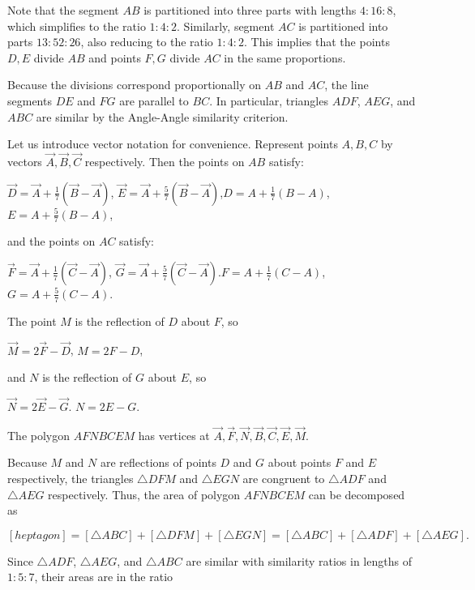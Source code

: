\begin{enumerate}
 Note that the segment \( AB \) is partitioned into three parts with lengths \( 4:16:8 \), which simplifies to the ratio \( 1:4:2 \). Similarly, segment \( AC \) is partitioned into parts \( 13:52:26 \), also reducing to the ratio \( 1:4:2 \). This implies that the points \( D, E \) divide \( AB \) and points \( F, G \) divide \( AC \) in the same proportions.

 Because the divisions correspond proportionally on \( AB \) and \( AC \), the line segments \( DE \) and \( FG \) are parallel to \( BC \). In particular, triangles \( ADF \), \( AEG \), and \( ABC \) are similar by the Angle-Angle similarity criterion.

 Let us introduce vector notation for convenience. Represent points \( A, B, C \) by vectors \( \vec{A}, \vec{B}, \vec{C} \) respectively. Then the points on \( AB \) satisfy:

 \( \vec{D} = \vec{A} + \frac{1}{7} (\vec{B} - \vec{A}) \), \( \vec{E} = \vec{A} + \frac{5}{7} (\vec{B} - \vec{A}) \),\( D = A + \frac{1}{7} (B - A) \), \( E = A + \frac{5}{7} (B - A) \),

 and the points on \( AC \) satisfy:

 \( \vec{F} = \vec{A} + \frac{1}{7} (\vec{C} - \vec{A}) \), \( \vec{G} = \vec{A} + \frac{5}{7} (\vec{C} - \vec{A}) \).\( F = A + \frac{1}{7} (C - A) \), \( G = A + \frac{5}{7} (C - A) \).

 The point \( M \) is the reflection of \( D \) about \( F \), so

 \( \vec{M} = 2\vec{F} - \vec{D} \), \( M = 2F - D \),

 and \( N \) is the reflection of \( G \) about \( E \), so

 \( \vec{N} = 2\vec{E} - \vec{G} \). \( N = 2E - G \).

 The polygon \( AFNBCEM \) has vertices at \( \vec{A}, \vec{F}, \vec{N}, \vec{B}, \vec{C}, \vec{E}, \vec{M} \).

 Because \( M \) and \( N \) are reflections of points \( D \) and \( G \) about points \( F \) and \( E \) respectively, the triangles \( \triangle DFM \) and \( \triangle EGN \) are congruent to \( \triangle ADF \) and \( \triangle AEG \) respectively. Thus, the area of polygon \( AFNBCEM \) can be decomposed as

 
 \[[heptagon] = [ \triangle ABC ] + [ \triangle DFM ] + [ \triangle EGN ] = [ \triangle ABC ] + [ \triangle ADF ] + [ \triangle AEG ].\]

 Since \( \triangle ADF \), \( \triangle AEG \), and \( \triangle ABC \) are similar with similarity ratios in lengths of \( 1:5:7 \), their areas are in the ratio


\end{enumerate}
